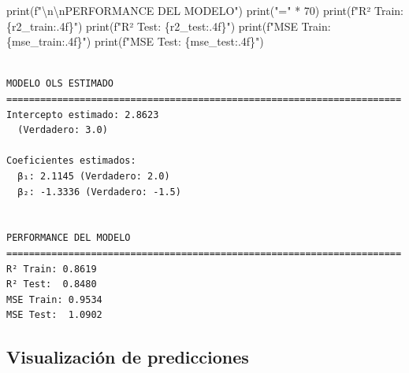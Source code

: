 \documentclass[
  doc,
  floatsintext,
  longtable,
  a4paper,
  nolmodern,
  notxfonts,
  notimes,
  12pt,
  colorlinks=true,linkcolor=blue,citecolor=blue,urlcolor=blue]{apa7}
\newenvironment{Shaded}{\begin{snugshade}}{\end{snugshade}}
\newcommand{\BuiltInTok}[1]{\textcolor[rgb]{0.00,0.23,0.31}{#1}}
\newcommand{\CharTok}[1]{\textcolor[rgb]{0.13,0.47,0.30}{#1}}
\newcommand{\DecValTok}[1]{\textcolor[rgb]{0.68,0.00,0.00}{#1}}
\newcommand{\NormalTok}[1]{\textcolor[rgb]{0.00,0.23,0.31}{#1}}
\newcommand{\OperatorTok}[1]{\textcolor[rgb]{0.37,0.37,0.37}{#1}}
\newcommand{\SpecialCharTok}[1]{\textcolor[rgb]{0.37,0.37,0.37}{#1}}
\newcommand{\SpecialStringTok}[1]{\textcolor[rgb]{0.13,0.47,0.30}{#1}}
\newcommand{\StringTok}[1]{\textcolor[rgb]{0.13,0.47,0.30}{#1}}
\begin{document}
\begin{Shaded}
\begin{Highlighting}[]
\BuiltInTok{print}\NormalTok{(}\SpecialStringTok{f"}\CharTok{\textbackslash{}n\textbackslash{}n}\SpecialStringTok{PERFORMANCE DEL MODELO"}\NormalTok{)}
\BuiltInTok{print}\NormalTok{(}\StringTok{"="} \OperatorTok{*} \DecValTok{70}\NormalTok{)}
\BuiltInTok{print}\NormalTok{(}\SpecialStringTok{f"R² Train: }\SpecialCharTok{\{}\NormalTok{r2\_train}\SpecialCharTok{:.4f\}}\SpecialStringTok{"}\NormalTok{)}
\BuiltInTok{print}\NormalTok{(}\SpecialStringTok{f"R² Test:  }\SpecialCharTok{\{}\NormalTok{r2\_test}\SpecialCharTok{:.4f\}}\SpecialStringTok{"}\NormalTok{)}
\BuiltInTok{print}\NormalTok{(}\SpecialStringTok{f"MSE Train: }\SpecialCharTok{\{}\NormalTok{mse\_train}\SpecialCharTok{:.4f\}}\SpecialStringTok{"}\NormalTok{)}
\BuiltInTok{print}\NormalTok{(}\SpecialStringTok{f"MSE Test:  }\SpecialCharTok{\{}\NormalTok{mse\_test}\SpecialCharTok{:.4f\}}\SpecialStringTok{"}\NormalTok{)}
\end{Highlighting}
\end{Shaded}

\begin{verbatim}

MODELO OLS ESTIMADO
======================================================================
Intercepto estimado: 2.8623
  (Verdadero: 3.0)

Coeficientes estimados:
  β₁: 2.1145 (Verdadero: 2.0)
  β₂: -1.3336 (Verdadero: -1.5)


PERFORMANCE DEL MODELO
======================================================================
R² Train: 0.8619
R² Test:  0.8480
MSE Train: 0.9534
MSE Test:  1.0902
\end{verbatim}

\subsection{Visualización de
predicciones}\label{visualizaciuxf3n-de-predicciones}
\end{document}
